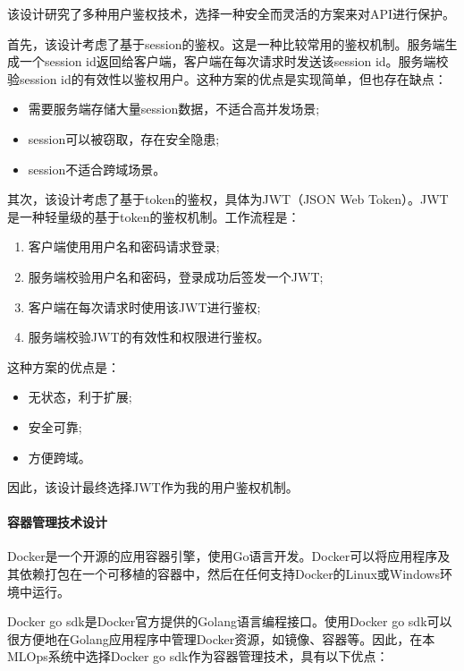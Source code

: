 \documentclass{HDU-Bachelor-Thesis}
\begin{document}
该设计研究了多种用户鉴权技术，选择一种安全而灵活的方案来对API进行保护。

首先，该设计考虑了基于session的鉴权。这是一种比较常用的鉴权机制。服务端生成一个session id返回给客户端，客户端在每次请求时发送该session id。服务端校验session id的有效性以鉴权用户。这种方案的优点是实现简单，但也存在缺点：

\begin{itemize}   
    \item 需要服务端存储大量session数据，不适合高并发场景; 
    \item session可以被窃取，存在安全隐患;
    \item session不适合跨域场景。
\end{itemize}

其次，该设计考虑了基于token的鉴权，具体为JWT（JSON Web Token）。JWT是一种轻量级的基于token的鉴权机制。工作流程是：

\begin{enumerate}   
    \item 客户端使用用户名和密码请求登录;
    \item 服务端校验用户名和密码，登录成功后签发一个JWT;
    \item 客户端在每次请求时使用该JWT进行鉴权;  
    \item 服务端校验JWT的有效性和权限进行鉴权。
\end{enumerate}

这种方案的优点是：

\begin{itemize}
    \item 无状态，利于扩展;  
    \item 安全可靠; 
    \item 方便跨域。
\end{itemize}

因此，该设计最终选择JWT作为我的用户鉴权机制。

\paragraph{容器管理技术设计}

Docker是一个开源的应用容器引擎，使用Go语言开发。Docker可以将应用程序及其依赖打包在一个可移植的容器中，然后在任何支持Docker的Linux或Windows环境中运行。

Docker go sdk是Docker官方提供的Golang语言编程接口。使用Docker go sdk可以很方便地在Golang应用程序中管理Docker资源，如镜像、容器等。因此，在本MLOps系统中选择Docker go sdk作为容器管理技术，具有以下优点：
\end{document}
